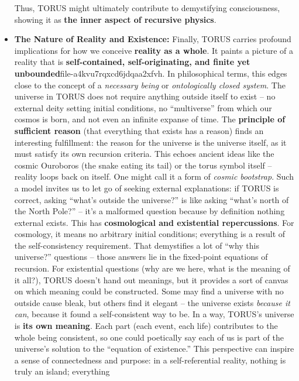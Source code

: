 \documentclass[
]{article}
\begin{document}
\begin{itemize}
  Thus, TORUS might ultimately contribute to demystifying consciousness,
  showing it as \textbf{the inner aspect of recursive physics}.
\item
  \textbf{The Nature of Reality and Existence:} Finally, TORUS carries
  profound implications for how we conceive \textbf{reality as a whole}.
  It paints a picture of a reality that is \textbf{self-contained,
  self-originating, and finite yet
  unbounded}\hspace{0pt}file-a4kvu7rqxcd6jdqaa2xfvh. In philosophical
  terms, this edges close to the concept of a \emph{necessary being} or
  \emph{ontologically closed system}. The universe in TORUS does not
  require anything outside itself to exist -- no external deity setting
  initial conditions, no ``multiverse'' from which our cosmos is born,
  and not even an infinite expanse of time. The \textbf{principle of
  sufficient reason} (that everything that exists has a reason) finds an
  interesting fulfillment: the reason for the universe is the universe
  itself, as it must satisfy its own recursion criteria. This echoes
  ancient ideas like the cosmic Ouroboros (the snake eating its tail) or
  the torus symbol itself -- reality loops back on itself. One might
  call it a form of \emph{cosmic bootstrap}. Such a model invites us to
  let go of seeking external explanations: if TORUS is correct, asking
  ``what's outside the universe?'' is like asking ``what's north of the
  North Pole?'' -- it's a malformed question because by definition
  nothing external exists. This has \textbf{cosmological and existential
  repercussions}. For cosmology, it means no arbitrary initial
  conditions; everything is a result of the self-consistency
  requirement. That demystifies a lot of ``why this universe?''
  questions -- those answers lie in the fixed-point equations of
  recursion. For existential questions (why are we here, what is the
  meaning of it all?), TORUS doesn't hand out meanings, but it provides
  a sort of canvas on which meaning could be constructed. Some may find
  a universe with no outside cause bleak, but others find it elegant --
  the universe exists \emph{because it can}, because it found a
  self-consistent way to be. In a way, TORUS's universe is \textbf{its
  own meaning}. Each part (each event, each life) contributes to the
  whole being consistent, so one could poetically say each of us is part
  of the universe's solution to the ``equation of existence.'' This
  perspective can inspire a sense of connectedness and purpose: in a
  self-referential reality, nothing is truly an island; everything

\end{itemize}
\end{document}
